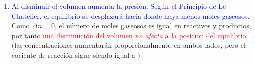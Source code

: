 \begin{exerciseEVAU}
\begin{solu}
\begin{enumerate}[label=\letraminuscula]
        \item \textcolor{blue}{Al disminuir el volumen aumenta la presión. Según el Principio de Le Chatelier, el equilibrio se desplazará hacia donde haya menos moles gaseosos.} Como \(\Delta n = 0\), el número de moles gaseosos es igual en reactivos y productos, por tanto \textcolor{red}{una disminución del volumen \emph{no afecta} a la posición del equilibrio} (las concentraciones aumentarán proporcionalmente en ambos lados, pero el cociente de reacción sigue siendo igual a \Kc{}).
    \end{enumerate}

    \end{solu}
\end{exerciseEVAU}


